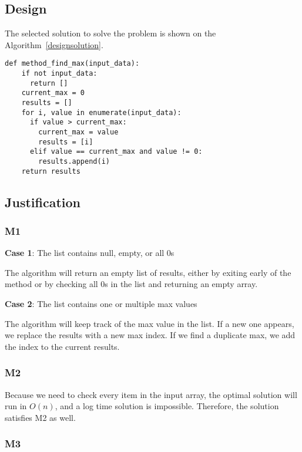 \documentclass{article}
\begin{document}
\subsection{Design}

The selected solution to solve the problem is shown on the Algorithm~\ref{designsolution}.

\begin{lstlisting}[style=mypython,caption={Code for solution to retrieve max intensities},label=designsolution,captionpos=b]
  def method_find_max(input_data):
    if not input_data:
      return []
    current_max = 0
    results = []
    for i, value in enumerate(input_data):  
      if value > current_max:
        current_max = value
        results = [i]
      elif value == current_max and value != 0:
        results.append(i)
    return results
\end{lstlisting}
 
\subsection{Justification}

\subsubsection{M1}

\textbf{Case 1}: The list contains null, empty, or all 0s

The algorithm will return an empty list of results, either by exiting early of the method or by checking all 0s in the list and returning an empty array.

\textbf{Case 2}: The list contains one or multiple max values

The algorithm will keep track of the max value in the list. If a new one appears, we replace the results with a new max index. If we find a duplicate max, we add the index to the current results.

\subsubsection{M2}

Because we need to check every item in the input array, the optimal solution will run in $O(n)$, and a log time solution is impossible. Therefore, the solution satisfies M2 as well.

\subsubsection{M3}
\end{document}
